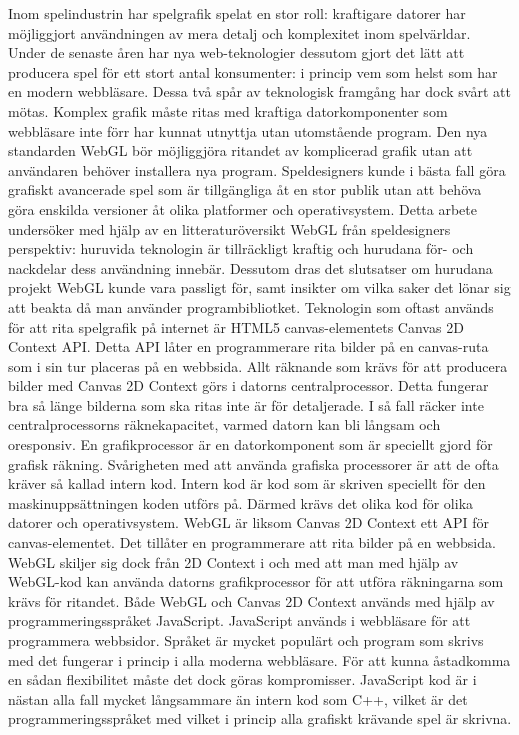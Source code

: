 Inom spelindustrin har spelgrafik spelat en stor roll: kraftigare datorer har möjliggjort användningen av mera detalj och komplexitet inom spelvärldar. Under de senaste åren har nya web-teknologier dessutom gjort det lätt att producera spel för ett stort antal konsumenter: i princip vem som helst som har en modern webbläsare. Dessa två spår av teknologisk framgång har dock svårt att mötas. Komplex grafik måste ritas med kraftiga datorkomponenter som webbläsare inte förr har kunnat utnyttja utan utomstående program. Den nya standarden WebGL bör möjliggjöra ritandet av komplicerad grafik utan att användaren behöver installera nya program. Speldesigners kunde i bästa fall göra grafiskt avancerade spel som är tillgängliga åt en stor publik utan att behöva göra enskilda versioner åt olika platformer och operativsystem. Detta arbete undersöker med hjälp av en litteraturöversikt WebGL från speldesigners perspektiv: huruvida teknologin är tillräckligt kraftig och hurudana för- och nackdelar dess användning innebär. Dessutom dras det slutsatser om hurudana projekt WebGL kunde vara passligt för, samt insikter om vilka saker det lönar sig att beakta då man använder programbibliotket.
Teknologin som oftast används för att rita spelgrafik på internet är HTML5 canvas-elementets Canvas 2D Context API. Detta API låter en programmerare rita bilder på en canvas-ruta som i sin tur placeras på en webbsida. Allt räknande som krävs för att producera bilder med Canvas 2D Context görs i datorns centralprocessor. Detta fungerar bra så länge bilderna som ska ritas inte är för detaljerade. I så fall räcker inte centralprocessorns räknekapacitet, varmed datorn kan bli långsam och oresponsiv.
En grafikprocessor är en datorkomponent som är speciellt gjord för grafisk räkning. Svårigheten med att använda grafiska processorer är att de ofta kräver så kallad intern kod. Intern kod är kod som är skriven speciellt för den maskinuppsättningen koden utförs på. Därmed krävs det olika kod för olika datorer och operativsystem. 
WebGL är liksom Canvas 2D Context ett API för canvas-elementet. Det tillåter en programmerare att rita bilder på en webbsida. WebGL skiljer sig dock från 2D Context i och med att man med hjälp av WebGL-kod kan använda datorns grafikprocessor för att utföra räkningarna som krävs för ritandet.
Både WebGL och Canvas 2D Context används med hjälp av programmeringsspråket JavaScript. JavaScript används i webbläsare för att programmera webbsidor. Språket är mycket populärt och program som skrivs med det fungerar i princip i alla moderna webbläsare. För att kunna åstadkomma en sådan flexibilitet måste det dock göras kompromisser. JavaScript kod är i nästan alla fall mycket långsammare än intern kod som C++, vilket är det programmeringsspråket med vilket i princip alla grafiskt krävande spel är skrivna.
